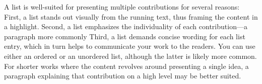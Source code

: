 


\noindent
A list is well-suited for presenting multiple contributions for several reasons:
First, a list stands out visually from the running text, thus framing the content in a highlight.
Second, a list emphasizes the individuality of each contribution---a paragraph more commonly 
Third, a list demands concise wording for each list entry, which in turn helps to communicate your work to the readers.
You can use either an ordered or an unordered list, although the latter is likely more common.
For shorter works where the content revolves around presenting a single idea, a paragraph explaining that contribution on a high level may be better suited.
